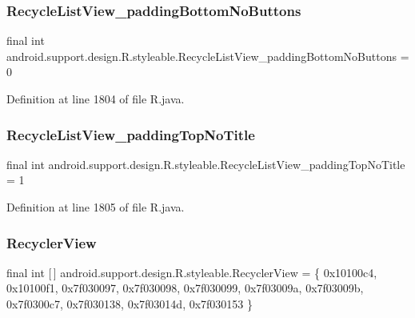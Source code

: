 \subsubsection{\texorpdfstring{RecycleListView\_paddingBottomNoButtons}{RecycleListView\_paddingBottomNoButtons}}
{\footnotesize\ttfamily final int android.\+support.\+design.\+R.\+styleable.\+Recycle\+List\+View\+\_\+padding\+Bottom\+No\+Buttons = 0\hspace{0.3cm}{\ttfamily [static]}}



Definition at line 1804 of file R.\+java.

\mbox{\label{classandroid_1_1support_1_1design_1_1_r_1_1styleable_a2a7057fc4a02aacc39f806ea8844e76a}} 
\subsubsection{\texorpdfstring{RecycleListView\_paddingTopNoTitle}{RecycleListView\_paddingTopNoTitle}}
{\footnotesize\ttfamily final int android.\+support.\+design.\+R.\+styleable.\+Recycle\+List\+View\+\_\+padding\+Top\+No\+Title = 1\hspace{0.3cm}{\ttfamily [static]}}



Definition at line 1805 of file R.\+java.

\mbox{\label{classandroid_1_1support_1_1design_1_1_r_1_1styleable_a1700d79470c52662f934bd53b1a05a14}} 
\subsubsection{\texorpdfstring{RecyclerView}{RecyclerView}}
{\footnotesize\ttfamily final int \mbox{[}$\,$\mbox{]} android.\+support.\+design.\+R.\+styleable.\+Recycler\+View = \{ 0x10100c4, 0x10100f1, 0x7f030097, 0x7f030098, 0x7f030099, 0x7f03009a, 0x7f03009b, 0x7f0300c7, 0x7f030138, 0x7f03014d, 0x7f030153 \}\hspace{0.3cm}{\ttfamily [static]}}



